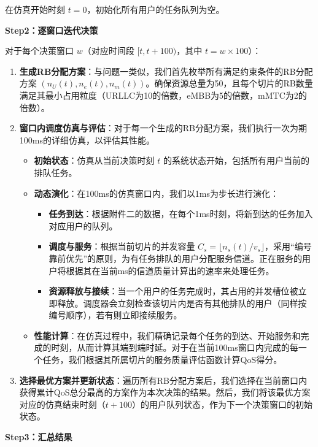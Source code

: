 在仿真开始时刻 $t=0$，初始化所有用户的任务队列为空。

\textbf{Step2：逐窗口迭代决策}

对于每个决策窗口 $w$（对应时间段 $[t, t+100)$，其中 $t = w \times 100$）：

\begin{enumerate}
    \item \textbf{生成RB分配方案}：与问题一类似，我们首先枚举所有满足约束条件的RB分配方案 $(n_U(t), n_e(t), n_m(t))$。确保资源总量为50，且每个切片的RB数量满足其最小占用粒度（URLLC为10的倍数，eMBB为5的倍数，mMTC为2的倍数）。

    \item \textbf{窗口内调度仿真与评估}：对于每一个生成的RB分配方案，我们执行一次为期100ms的详细仿真，以评估其性能。
    \begin{itemize}
        \item \textbf{初始状态}：仿真从当前决策时刻 $t$ 的系统状态开始，包括所有用户当前的排队任务。
        \item \textbf{动态演化}：在100ms的仿真窗口内，我们以1ms为步长进行演化：
        \begin{itemize}
            \item \textbf{任务到达}：根据附件二的数据，在每个1ms时刻，将新到达的任务加入对应用户的队列。
            \item \textbf{调度与服务}：根据当前切片的并发容量 $C_s = \lfloor n_s(t) / v_s \rfloor$，采用“编号靠前优先”的原则，为有任务排队的用户分配服务信道。正在服务的用户将根据其在当前ms的信道质量计算出的速率来处理任务。
            \item \textbf{资源释放与接续}：当一个用户的任务完成时，其占用的并发槽位被立即释放。调度器会立刻检查该切片内是否有其他排队的用户（同样按编号顺序），若有则立即接续服务。
        \end{itemize}
        \item \textbf{性能计算}：在仿真过程中，我们精确记录每个任务的到达、开始服务和完成的时刻，从而计算其端到端时延。对于在当前100ms窗口内完成的每一个任务，我们根据其所属切片的服务质量评估函数计算QoS得分。
    \end{itemize}
    
    \item \textbf{选择最优方案并更新状态}：遍历所有RB分配方案后，我们选择在当前窗口内获得累计QoS总分最高的方案作为本次决策的结果。然后，我们将该最优方案对应的仿真结束时刻（$t+100$）的用户队列状态，作为下一个决策窗口的初始状态。
\end{enumerate}

\textbf{Step3：汇总结果}


